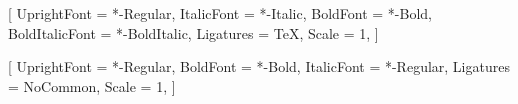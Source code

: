 %
%
%
\usepackage{fontspec}

\setmainfont{Charis}[
  UprightFont    = *-Regular,
  ItalicFont     = *-Italic,
  BoldFont       = *-Bold,
  BoldItalicFont = *-BoldItalic,
  Ligatures      = TeX,
  Scale          = 1,
]

\setmonofont{Inconsolata}[
  UprightFont    = *-Regular,
  BoldFont       = *-Bold,
  ItalicFont     = *-Regular,
  Ligatures      = NoCommon,
  Scale          = 1,
]


